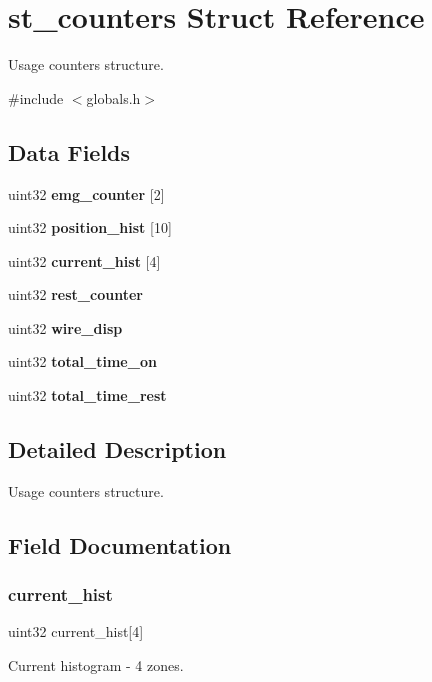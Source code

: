 \section{st\+\_\+counters Struct Reference}
\label{structst__counters}


Usage counters structure.  




{\ttfamily \#include $<$globals.\+h$>$}

\subsection*{Data Fields}
\begin{DoxyCompactItemize}
\item 
uint32 \textbf{ emg\+\_\+counter} [2]
\item 
uint32 \textbf{ position\+\_\+hist} [10]
\item 
uint32 \textbf{ current\+\_\+hist} [4]
\item 
uint32 \textbf{ rest\+\_\+counter}
\item 
uint32 \textbf{ wire\+\_\+disp}
\item 
uint32 \textbf{ total\+\_\+time\+\_\+on}
\item 
uint32 \textbf{ total\+\_\+time\+\_\+rest}
\end{DoxyCompactItemize}


\subsection{Detailed Description}
Usage counters structure. 



\subsection{Field Documentation}
\mbox{\label{structst__counters_a5fbf9566abdebf78712e7986d399e749}} 
\subsubsection{current\+\_\+hist}
{\footnotesize\ttfamily uint32 current\+\_\+hist[4]}

Current histogram -\/ 4 zones. \mbox{\label{structst__counters_a4f0e42865ba18f09c8cd90f8cd36534c}} 
